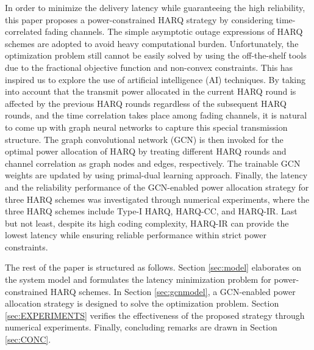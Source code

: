 \documentclass[conference]{IEEEtran}
\begin{document}
In order to minimize the delivery latency while guaranteeing the high reliability, this paper proposes a power-constrained HARQ strategy by considering time-correlated fading channels. The simple asymptotic outage expressions of HARQ schemes are adopted to avoid heavy computational burden. Unfortunately, the optimization problem still cannot be easily solved by  using the off-the-shelf tools due to the fractional objective function and non-convex constraints. This has inspired us to explore the use of artificial intelligence (AI) techniques. By taking into account that the transmit power allocated in the current HARQ round is affected by the previous HARQ rounds regardless of the subsequent HARQ rounds, and the time correlation takes place among fading channels, it is natural to come up with graph neural networks to capture this special transmission structure. The graph convolutional network (GCN) is then invoked for the optimal power allocation of HARQ by treating different HARQ rounds and channel correlation as graph nodes and edges, respectively. The trainable GCN weights are updated by using primal-dual learning approach. Finally, the latency and the reliability performance of the GCN-enabled power allocation strategy for three HARQ schemes was investigated through numerical experiments, where the three HARQ schemes include Type-I HARQ, HARQ-CC, and HARQ-IR. Last but not least, despite its high coding complexity, HARQ-IR can provide the lowest latency while ensuring reliable performance within strict power constraints.



The rest of the paper is structured as follows. Section \ref{sec:model} elaborates on the system model and formulates the latency minimization problem for power-constrained HARQ schemes. In Section \ref{sec:gcnmodel}, a GCN-enabled power allocation strategy is designed to solve the optimization problem. Section \ref{sec:EXPERIMENTS} verifies the effectiveness of the proposed strategy through numerical experiments. Finally, concluding remarks are drawn in Section \ref{sec:CONC}.
\end{document}

